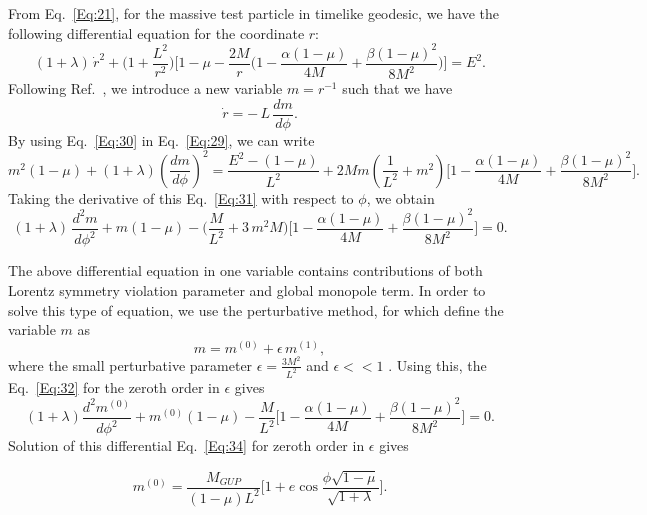 \documentclass[aps,amsmath,amssymb,showpacs,showkeys]{revtex4}
\begin{document}
From Eq.\ \eqref{Eq:21}, for the massive test particle in timelike geodesic, 
we have the following differential equation for the coordinate $r$:
\begin{equation}
(1+\lambda)\,\dot{r}^2 +\Big(1+\frac{L^2}{r^2}\Big)\Big[1-\mu-\frac{2M}{r}\Big(1-\frac{\alpha(1-\mu)}{4M}+\frac{\beta(1-\mu)^2}{8M^2}\Big)\Big]=E^2.
\label{Eq:29}
\end{equation}                                                                  
Following Ref.\ \cite{17}, we introduce a new variable $m=r^{-1}$ such that 
we have 
\begin{equation}
\dot{r}=-\,L\,\frac{dm}{d\phi}.
\label{Eq:30}
\end{equation}
By using Eq.\ \eqref{Eq:30} in Eq.\ \eqref{Eq:29}, we can write
\begin{equation}
m^2(1-\mu )+(1+\lambda)\left(\frac{dm}{d\phi}\right)^2=\frac{E^2-(1-\mu )}{L^2}+2M m\left(\frac{1}{L^2}+m^2\right)\bigg[1-\frac{\alpha(1-\mu)}{4M}+\frac{\beta(1-\mu)^2}{8M^2}\bigg].
\label{Eq:31}
\end{equation}
Taking the derivative of this Eq.\ \eqref{Eq:31} with respect to $\phi$, we 
obtain 
\begin{equation}
(1+\lambda)\,\frac{d^2 m}{d\phi^2}+m(1-\mu)-\bigg(\frac{M}{L^2}+3\,m^2 M\bigg)\bigg[1-\frac{\alpha(1-\mu)}{4M}+\frac{\beta(1-\mu)^2}{8M^2}\bigg]=0.
\label{Eq:32}
\end{equation}

The above differential equation in one variable contains contributions of both 
Lorentz symmetry violation parameter and global monopole term. In order to 
solve this type of equation, we use the perturbative method, for which define 
the variable $m$ as
\begin{equation}
m=m^{(0)}+\epsilon\, m^{(1)},
\label{Eq:33}
\end{equation} 
where the small perturbative parameter $\epsilon=\frac{3M^2}{L^2}$ and 
$\epsilon<<1$ \cite{17}. Using this, the Eq.\ \eqref{Eq:32} for the zeroth 
order in $\epsilon$ gives
\begin{equation}
(1+\lambda)\frac{d^2 m^{(0)}}{d\phi^2}+m^{(0)}(1-\mu)-\frac{M}{L^2}\bigg[1-\frac{\alpha(1-\mu)}{4M}+\frac{\beta(1-\mu)^2}{8M^2}\bigg]=0.
\label{Eq:34}
\end{equation} 
Solution of this differential Eq.\ \eqref{Eq:34} for zeroth order in 
$\epsilon$ gives 

\begin{equation}
 m^{(0)}=\frac{M_{GUP}}{(1-\mu)L^2}\bigg[1+e \cos \frac{\phi \sqrt{1-\mu}}{\sqrt{1+\lambda}}\bigg].
\label{Eq:35}
\end{equation}
\end{document}
